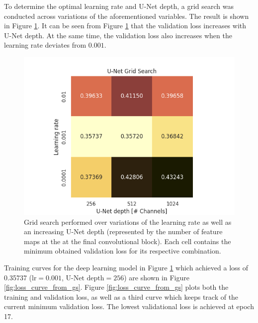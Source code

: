\documentclass[../main/thesis]{subfiles}
\begin{document}
To determine the optimal learning rate and U-Net depth, a grid search was conducted across variations of the aforementioned variables. The result is shown in Figure \ref{fig:gs}. It can be seen from Figure \ref{fig:gs} that the validation loss increases with U-Net depth. At the same time, the validation loss also increases when the learning rate deviates from $0.001$.

\begin{figure}
    \centering
    \includegraphics[width=.8\textwidth]{grid_search}
    \caption{\label{fig:gs}Grid search performed over variations of the learning rate as well as an increasing U-Net depth (represented by the number of feature maps at the at the final convolutional block). Each cell contains the minimum obtained validation loss for its respective combination.}
\end{figure}

Training curves for the deep learning model in Figure \ref{fig:gs} which achieved a loss of 0.35737 ($\text{lr} = 0.001$, $\text{U-Net depth} = 256$) are shown in Figure \ref{fig:loss_curve_from_gs}. Figure \ref{fig:loss_curve_from_gs} plots both the training and validation loss, as well as a third curve which keeps track of the current minimum validation loss. The lowest validational loss is achieved at epoch 17. 
\end{document}
